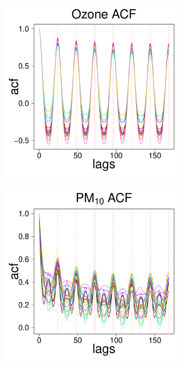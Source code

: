 \documentclass[alpha-refs]{wiley-article}
\begin{document}
{ \footnotesize
\vspace{-3mm}
\begin{figure}[H]
  \begin{center}
   \begin{subfigure}[b]{.24\textwidth}
      \includegraphics[width=\textwidth]{acf_o3.pdf}
   \end{subfigure}
  \begin{subfigure}[b]{.24\textwidth}
     \includegraphics[width=\textwidth]{acf_pm10.pdf}

\end{subfigure}
\end{center}
\end{figure}}
\end{document}
